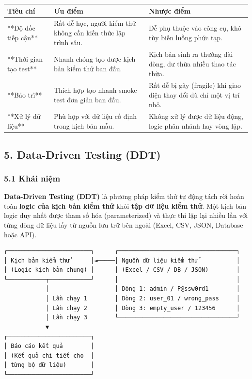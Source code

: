 \begin{table}[H]
\centering
\begin{tabular}{|l|l|l|}
\hline
\textbf{Tiêu chí} & \textbf{Ưu điểm} & \textbf{Nhược điểm} \\ \hline
**Độ dốc tiếp cận** & Rất dễ học, người kiểm thử không cần kiến thức lập trình sâu. & Dễ phụ thuộc vào công cụ, khó tùy biến luồng phức tạp. \\ \hline
**Thời gian tạo test** & Nhanh chóng tạo được kịch bản kiểm thử ban đầu. & Kịch bản sinh ra thường dài dòng, dư thừa nhiều thao tác thừa. \\ \hline
**Bảo trì** & Thích hợp tạo nhanh smoke test đơn giản ban đầu. & Rất dễ bị gãy (fragile) khi giao diện thay đổi dù chỉ một vị trí nhỏ. \\ \hline
**Xử lý dữ liệu** & Phù hợp với dữ liệu cố định trong kịch bản mẫu. & Không xử lý được dữ liệu động, logic phân nhánh hay vòng lặp. \\ \hline
\end{tabular}
\end{table}







\subsection{5. Data-Driven Testing (DDT)}

\subsubsection{5.1 Khái niệm}

\textbf{Data-Driven Testing (DDT)} là phương pháp kiểm thử tự động tách rời hoàn toàn \textbf{logic của kịch bản kiểm thử} khỏi \textbf{tập dữ liệu kiểm thử}. Một kịch bản logic duy nhất được tham số hóa (parameterized) và thực thi lặp lại nhiều lần với từng dòng dữ liệu lấy từ nguồn lưu trữ bên ngoài (Excel, CSV, JSON, Database hoặc API).

\begin{lstlisting}
┌────────────────────────┐      ┌──────────────────────────────────┐
│ Kịch bản kiểm thử      │◄─────│ Nguồn dữ liệu kiểm thử           │
│ (Logic kịch bản chung) │      │ (Excel / CSV / DB / JSON)        │
└───────────┬────────────┘      │                                  │
            │                   │ Dòng 1: admin / P@ssw0rd1        │
            │ Lần chạy 1        │ Dòng 2: user_01 / wrong_pass     │
            │ Lần chạy 2        │ Dòng 3: empty_user / 123456      │
            │ Lần chạy 3        └──────────────────────────────────┘
            ▼
┌────────────────────────┐
│ Báo cáo kết quả        │
│ (Kết quả chi tiết cho  │
│ từng bộ dữ liệu)       │
└────────────────────────┘
\end{lstlisting}


